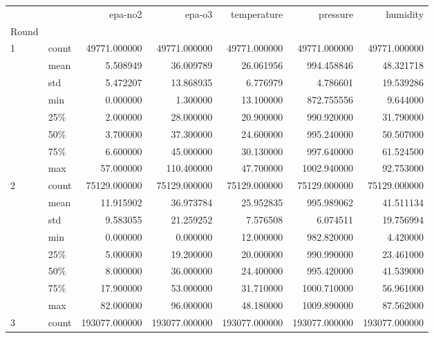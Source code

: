 \begin{tabular}{llrrrrr}
\toprule
  &       &        epa-no2 &         epa-o3 &    temperature &       pressure &       humidity \\
Round & {} &                &                &                &                &                \\
\midrule
1 & count &   49771.000000 &   49771.000000 &   49771.000000 &   49771.000000 &   49771.000000 \\
  & mean &       5.508949 &      36.009789 &      26.061956 &     994.458846 &      48.321718 \\
  & std &       5.472207 &      13.868935 &       6.776979 &       4.786601 &      19.539286 \\
  & min &       0.000000 &       1.300000 &      13.100000 &     872.755556 &       9.644000 \\
  & 25\% &       2.000000 &      28.000000 &      20.900000 &     990.920000 &      31.790000 \\
  & 50\% &       3.700000 &      37.300000 &      24.600000 &     995.240000 &      50.507000 \\
  & 75\% &       6.600000 &      45.000000 &      30.130000 &     997.640000 &      61.524500 \\
  & max &      57.000000 &     110.400000 &      47.700000 &    1002.940000 &      92.753000 \\
2 & count &   75129.000000 &   75129.000000 &   75129.000000 &   75129.000000 &   75129.000000 \\
  & mean &      11.915902 &      36.973784 &      25.952835 &     995.989062 &      41.511134 \\
  & std &       9.583055 &      21.259252 &       7.576508 &       6.074511 &      19.756994 \\
  & min &       0.000000 &       0.000000 &      12.000000 &     982.820000 &       4.420000 \\
  & 25\% &       5.000000 &      19.200000 &      20.000000 &     990.990000 &      23.461000 \\
  & 50\% &       8.000000 &      36.000000 &      24.400000 &     995.420000 &      41.539000 \\
  & 75\% &      17.900000 &      53.000000 &      31.710000 &    1000.710000 &      56.961000 \\
  & max &      82.000000 &      96.000000 &      48.180000 &    1009.890000 &      87.562000 \\
3 & count &  193077.000000 &  193077.000000 &  193077.000000 &  193077.000000 &  193077.000000 \\

\end{tabular}
